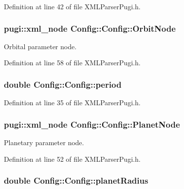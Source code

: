 Definition at line 42 of file XMLParserPugi.h.

\hypertarget{classConfig_1_1Config_a5b48e9e8de00ec0f85d7ac2bae12212d}{
\subsubsection[{OrbitNode}]{\setlength{\rightskip}{0pt plus 5cm}pugi::xml\_\-node {\bf Config::Config::OrbitNode}}}
\label{classConfig_1_1Config_a5b48e9e8de00ec0f85d7ac2bae12212d}


Orbital parameter node. 



Definition at line 58 of file XMLParserPugi.h.

\hypertarget{classConfig_1_1Config_afc6907d04c9ccbf1479845699943c3bc}{
\subsubsection[{period}]{\setlength{\rightskip}{0pt plus 5cm}double {\bf Config::Config::period}}}
\label{classConfig_1_1Config_afc6907d04c9ccbf1479845699943c3bc}


Definition at line 35 of file XMLParserPugi.h.

\hypertarget{classConfig_1_1Config_a86646003839a5b91e5c9281bb0c65e4a}{
\subsubsection[{PlanetNode}]{\setlength{\rightskip}{0pt plus 5cm}pugi::xml\_\-node {\bf Config::Config::PlanetNode}}}
\label{classConfig_1_1Config_a86646003839a5b91e5c9281bb0c65e4a}


Planetary parameter node. 



Definition at line 52 of file XMLParserPugi.h.

\hypertarget{classConfig_1_1Config_aa7f8b446e7c7db6ab117de7bb12e8193}{
\subsubsection[{planetRadius}]{\setlength{\rightskip}{0pt plus 5cm}double {\bf Config::Config::planetRadius}}}
\label{classConfig_1_1Config_aa7f8b446e7c7db6ab117de7bb12e8193}


